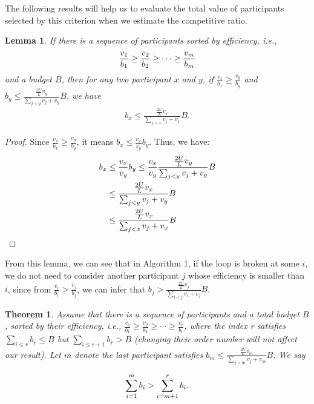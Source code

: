 \documentclass[10pt,journal,letterpaper,compsoc]{IEEEtran}
\newtheorem{theorem}{Theorem}
\newtheorem{lemma}{Lemma}
\newcommand{\ie}{{\em i.e.}}
\begin{document}
The following results will help us to evaluate the total value of participants selected by this criterion when we estimate the competitive ratio.
\begin{lemma}
If there is a sequence of participants sorted by efficiency, \ie, 
\begin{eqnarray}
\frac{v_1}{b_1} \ge \frac{v_2}{b_2} \ge \cdots \ge \frac{v_m}{b_m} \notag
\end{eqnarray}
 and a budget $B$, then for any two participant $x$ and $y$, if $\frac{v_x}{b_x} \ge \frac{v_y}{b_y}$ and $b_y \le \frac{\frac{2U}{L}v_y}{\sum_{j<y}v_j+v_y}B$, we have
\begin{eqnarray}
b_x \le \frac{\frac{2U}{L}v_x}{\sum_{j<x}v_j+v_x}B.
\end{eqnarray}
\end{lemma}

\begin{proof}
Since $\frac{v_x}{b_x} \ge \frac{v_y}{b_y}$, it means $b_x \le \frac{v_x}{v_y}b_y$. Thus, we have:
\begin{align}
b_x&\le \frac{v_x}{v_y}b_y  \le \frac{v_x}{v_y}\frac{\frac{2U}{L}v_y}{\sum_{j<y}v_j+v_y}B\notag\\
&\le \frac{\frac{2U}{L}v_x}{\sum_{j<y}v_j+v_y}B \notag\\
&\le \frac{\frac{2U}{L}v_x}{\sum_{j<x}v_j+v_x}B\notag
\end{align}




\end{proof}
From this lemma, we can see that in Algorithm 1, if the loop is broken at some $i$, we do not need to consider another participant $j$ whose efficiency is smaller than $i$, since from $\frac{v_i}{b_i} > \frac{v_j}{b_j}$, we can infer that $b_j > \frac{\frac{2U}{L}v_j}{\sum_{l<j}v_l+v_j}B$.
\begin{theorem}Assume that there is a sequence of participants and a total budget $B$, sorted by their efficiency, \ie, $\frac{v_1}{b_1} \ge \frac{v_2}{b_2} \ge \cdots \ge \frac{v_r}{b_r}$, where the index r satisfies $\sum_{i \le r} b_r \le B$ but $\sum_{i \le r+1} b_r > B $ (changing their order number will not affect our result). Let $m$ denote the last participant satisfies $b_m \le \frac{\frac{2U}{L}v_m}{\sum_{j<m}v_j+v_m}B$. We say
\begin{small}
\begin{eqnarray}
\sum_{i=1}^{m} b_i > \sum_{i=m+1}^{r}b_i. \notag
\end{eqnarray}
\end{small}
\end{theorem}
\end{document}

